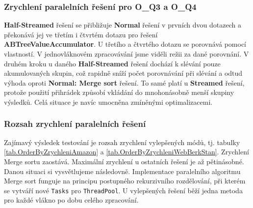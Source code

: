 \subsubsection{Zrychlení paralelních řešení pro O\_Q3 a O\_Q4 }

\textbf{Half-Streamed} řešení se přibližuje \textbf{Normal} řešení v prvních dvou dotazech a překonává jej ve třetím i čtvrtém dotazu pro řešení  \textbf{ABTreeValueAccumulator}.
U třetího a čtvrtého dotazu se porovnává pomocí vlastností. V jednovláknovém zpracovávání jsme viděli režii za dané porovnání.
V druhém kroku u daného \textbf{Half-Streamed} řešení dochází k slévání pouze akumulovaných skupin, což rapidně sníží počet porovnávání při slévání a odtud výhoda oproti \textbf{Normal: Merge sort} řešení. 
To samé platí u \textbf{Streamed} řešení, protože použití přihrádek způsobí vkládání do mnohonásobně menší skupiny výsledků. 
Celá situace je navíc umocněna zmíněnými optimalizacemi. 

\subsubsection{Rozsah zrychlení paralelních řešení}

Zajímavý výsledek testování je rozsah zrychlení vylepšených módů, tj. tabulky \ref{tab.OrderByZrychleniAmazon} a \ref{tab.OrderByZrychleniWebBerkStan}. 
Zrychlení Merge sortu zaostává. 
Maximální zrychlení u ostatních řešení je až pětinásobné. 
Danou situaci si vysvětlujeme následovně.
Implementace paralelního algoritmu Merge sort funguje na principu postupného rekurzivního rozdělování, při kterém se vytváří nové \verb+Tasks+ pro \verb+ThreadPool+.
U vylepšených řešení běží jedna metoda pro každé vlákno po dobu celého zpracování. 


